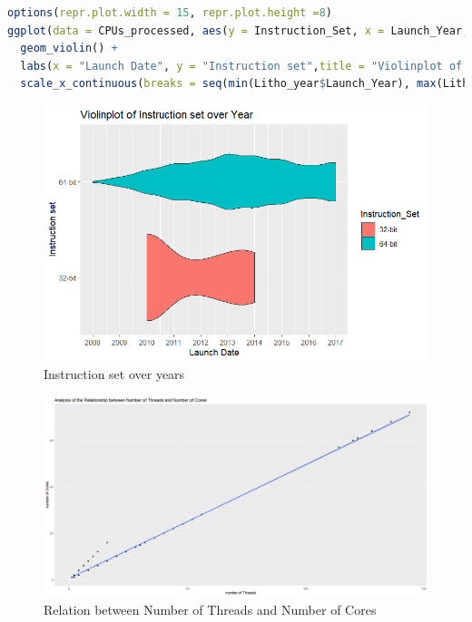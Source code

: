 \begin{lstlisting}[language=R]
options(repr.plot.width = 15, repr.plot.height =8) 
ggplot(data = CPUs_processed, aes(y = Instruction_Set, x = Launch_Year, fill = Instruction_Set)) +
  geom_violin() +
  labs(x = "Launch Date", y = "Instruction set",title = "Violinplot of Instruction set over Year") +
  scale_x_continuous(breaks = seq(min(Litho_year$Launch_Year), max(Litho_year$Launch_Year), by = 1))
\end{lstlisting}

\begin{figure}[ht]
  \centering
  \includegraphics[width=1\linewidth]{img/6432bit_year.png}
  \vspace{1pt}
  \caption{Instruction set over years}
\end{figure}

\begin{figure}[ht]
  \centering
  \includegraphics[width=1\linewidth]{img/CPU_ThreadCore.png}
  \vspace{1pt}
  \caption{Relation between Number of Threads and Number of Cores}
\end{figure}

